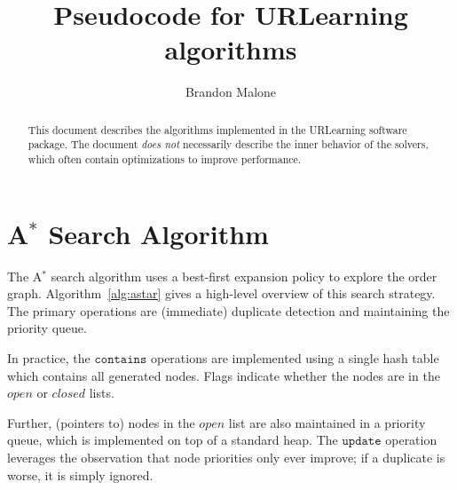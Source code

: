 \documentclass[a4paper,10pt]{article}
\title{Pseudocode for URLearning algorithms}
\author{Brandon Malone}
\def\|#1{\ensuremath{\mathtt{#1}}}
\newcommand\Astar{A$^{*}$\xspace}
\begin{document}
\maketitle

\begin{abstract}
This document describes the algorithms implemented in the URLearning software
package. The document \emph{does not} necessarily describe the inner behavior
of the solvers, which often contain optimizations to improve performance.
\end{abstract}

\section{\Astar Search Algorithm}

The \Astar search algorithm uses a best-first expansion policy to explore the
order graph. Algorithm~\ref{alg:astar} gives a high-level overview of this
search strategy. The primary operations are (immediate) duplicate detection
and maintaining the priority queue.

In practice, the \|{contains} operations are implemented using a single hash
table which contains all generated nodes. Flags indicate whether the nodes
are in the $open$ or $closed$ lists.

Further, (pointers to) nodes in the $open$ list are also maintained in a
priority queue, which is implemented on top of a standard heap. The \|{update}
operation leverages the observation that node priorities only ever improve; if
a duplicate is worse, it is simply ignored.
\end{document}
